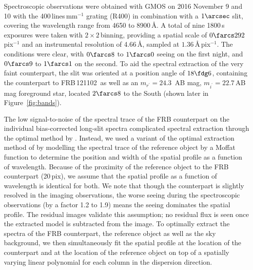 \documentclass[twocolumn]{aastex61}
\def \frb {FRB\,121102}
\begin{document}
Spectroscopic observations were obtained with GMOS on 2016 November 9
and 10 with the 400\,lines\,mm$^{-1}$ grating (R400) in combination
with a $1\arcsec$ slit, covering the wavelength range from 4650 to
8900\,\AA. A total of nine 1800\,s exposures were taken with
$2\times2$\,binning, providing a spatial scale of
$0\farcs292$\,pix$^{-1}$ and an instrumental resolution of 4.66\,\AA,
sampled at $1.36$\,\AA\,pix$^{-1}$. The conditions were clear, with
$0\farcs8$ to $1\farcs0$ seeing on the first night, and $0\farcs9$ to
$1\farcs1$ on the second. To aid the spectral extraction of the very faint counterpart, the slit was oriented at a position angle of
$18\fdg6$, containing the counterpart to \frb\ as well as
an $m_{r^\prime}=24.3$\, AB mag, $m_{i^\prime}=22.7$\,AB mag foreground star, located $2\farcs8$ to the South (shown later in Figure~\ref{fig:bands}). 

The low signal-to-noise of the spectral trace of the FRB counterpart
on the individual bias-corrected long-slit spectra complicated
spectral extraction through the optimal method by
\citet{hor86}. Instead, we used a variant of the optimal extraction method
of \citet{hyn02} by modelling the spectral trace of the reference
object by a Moffat function \citep{mof69} to determine the position
and width of the spatial profile as a function of wavelength. Because
of the proximity of the reference object to the FRB counterpart
(20\,pix), we assume that the spatial profile as a function of
wavelength is identical for both. We note that though the counterpart is slightly
resolved in the imaging observations, the worse seeing during the
spectroscopic observations (by a factor 1.2 to 1.9) means the seeing
dominates the spatial profile. The residual images validate this
assumption; no residual flux is seen once the extracted model is
subtracted from the image. To optimally extract the spectra of
the FRB counterpart, the reference object as well as the sky
background, we then simultaneously fit the spatial profile at the
location of the counterpart and at the location of the reference
object on top of a spatially varying linear polynomial for each column
in the dispersion direction.
\end{document}
